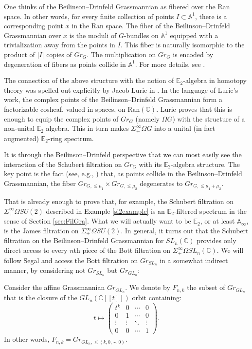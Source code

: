 One thinks of the Beilinson--Drinfeld Grassmannian as fibered over the Ran space.  In other words, for every finite collection of points $I \subset \mathbb{A}^1$, there is a corresponding point $x$ in the Ran space.  The fiber of the Beilinson--Drinfeld Grassmannian over $x$ is the moduli of $G$-bundles on $\mathbb{A}^1$ equipped with a trivialization away from the points in $I$.  This fiber is naturally isomorphic to the product of $|I|$ copies of $Gr_G$.  The multiplication on $Gr_G$ is encoded by degeneration of fibers as points collide in $\mathbb{A}^1$.  For more details, see \cite[\S 3]{Zhu}.

The connection of the above structure with the notion of $\mathbb{E}_2$-algebra in homotopy theory was spelled out explicitly by Jacob Lurie in \cite[\S 5.5]{HA}.  In the language of Lurie's work, the complex points of the Beilinson--Drinfeld Grassmannian form a factorizable cosheaf, valued in spaces, on $\mathrm{Ran}(\mathbb{C})$.  Lurie proves \cite[Theorem 5.5.4.10]{HA} that this is enough to equip the complex points of $Gr_G$ (namely $\Omega G$) with the structure of a non-unital $\mathbb{E}_2$ algebra.  This in turn makes $\Sigma^{\infty}_+ \Omega G$ into a unital (in fact augmented) $\mathbb{E}_2$-ring spectrum.

It is through the Beilinson--Drinfeld perspective that we can most easily see the interaction of the Schubert filtration on $Gr_G$ with its $\mathbb{E}_2$-algebra structure.  The key point is the fact (see, e.g., \cite[3.1.14]{Zhu}) that, as points collide in the Beilinson--Drinfeld Grassmannian, the fiber $Gr_{G,\le \mu_1} \times Gr_{G,\le \mu_2}$ degenerates to $Gr_{G, \le \mu_1+\mu_2}$.

That is already enough to prove that, for example, the Schubert filtration on $\Sigma^{\infty}_+ \Omega SU(2)$ described in Example \ref{sl2example} is an $\mathbb{E}_2$-filtered spectrum in the sense of Section \ref{sec:FilGra}.  What we will actually want to be $\mathbb{E}_2$, or at least $\mathbb{A}_\infty$, is the James filtration on $\Sigma^{\infty}_+ \Omega SU(2)$.  In general, it turns out that the Schubert filtration on the Beilinson--Drinfeld Grassmannian for $SL_n(\mathbb{C})$ provides only direct access to every $n$th piece of the Bott filtration on $\Sigma^{\infty}_+ \Omega SL_n(\mathbb{C})$.  We will follow Segal \cite{Segal} and access the Bott filtration on $Gr_{SL_n}$ in a somewhat indirect manner, by considering not $Gr_{SL_n}$ but $Gr_{GL_n}$:

\begin{dfn}
Consider the affine Grassmannian $Gr_{GL_n}$.  We denote by $F_{n,k}$ the subset of $Gr_{GL_n}$ that is the closure of the $GL_n(\mathbb{C}[[t]])$ orbit containing:
$$t \mapsto \left( \begin{array}{cccc} t^k & 0 & \cdots & 0 \\ 0 & 1 & \cdots & 0 \\ \vdots & \vdots & \ddots & \vdots \\ 0 & 0 & \cdots & 1 \end{array} \right).$$
In other words, $F_{n,k} = Gr_{GL_n, \le (k,0,\cdots,0)}$.
\end{dfn}

